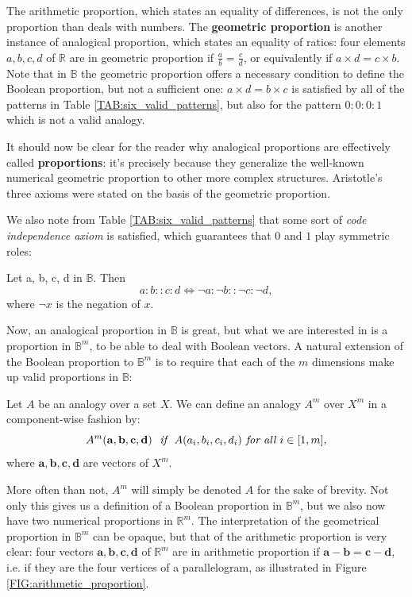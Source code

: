 The arithmetic proportion, which states an equality of differences, is not the
only proportion than deals with numbers. The \textbf{geometric proportion} is
another instance of analogical proportion, which states an equality of ratios:
four elements $a, b, c, d$ of $\mathbb{R}$ are in geometric proportion if
$\frac{a}{b} = \frac{c}{d}$, or equivalently if $a\times d = c\times b$.
Note that in $\mathbb{B}$ the geometric proportion offers a necessary condition
to define the Boolean proportion, but not a sufficient one: $a \times d =
b\times c$ is satisfied by all of the patterns in Table
\ref{TAB:six_valid_patterns}, but also for the pattern $0: 0: 0: 1$ which is
not a valid analogy.

It should now be clear for the reader why analogical proportions are
effectively called \textbf{proportions}: it's precisely because they generalize
the well-known numerical geometric proportion to other more complex structures.
Aristotle's three axioms were stated on the basis of the geometric proportion.

We also note from Table \ref{TAB:six_valid_patterns} that some sort of {\it
code independence axiom} is satisfied, which guarantees that $0$ and $1$ play
symmetric roles:

\begin{property}
  Let a, b, c, d in $\mathbb{B}$. Then
  $$a : b :: c : d \iff \neg a :  \neg b ::  \neg c :  \neg d,$$
  where $\neg x$ is the negation of $x$.
\end{property}

Now, an analogical proportion in $\mathbb{B}$ is great, but what we are
interested in is a proportion in $\mathbb{B}^m$, to be able to deal with
Boolean vectors. A natural extension of the Boolean proportion to
$\mathbb{B}^m$ is to require that each of the $m$ dimensions make up valid
proportions in $\mathbb{B}$:

\begin{definition}
  \label{DEF:analogy_for_vectors}
  Let $A$ be an analogy over a set $X$. We can define an analogy $A^m$
  over $X^m$ in a component-wise fashion by:
  $$A^m(\mathbf{a}, \mathbf{b}, \mathbf{c}, \mathbf{d}) ~ \emph{  if  } ~
  A(a_i, b_i, c_i, d_i) \emph{ for all } i \in [1, m],$$
  where $\mathbf{a}, \mathbf{b}, \mathbf{c}, \mathbf{d}$ are vectors of $X^m$.
\end{definition}
\noindent
More often than not, $A^m$ will simply be denoted $A$ for the sake of brevity. Not
only this gives us a definition of a Boolean proportion in $\mathbb{B}^m$, but
we also now have two numerical proportions in $\mathbb{R}^m$. The interpretation of
the geometrical proportion in $\mathbb{B}^m$ can be opaque, but that of the arithmetic proportion
is very clear: four vectors $\mathbf{a}, \mathbf{b}, \mathbf{c}, \mathbf{d}$ of
$\mathbb{R}^m$ are in arithmetic proportion if $\mathbf{a} - \mathbf{b} =
\mathbf{c} - \mathbf{d}$, i.e. if they are the four vertices of a
parallelogram, as illustrated in Figure \ref{FIG:arithmetic_proportion}.

